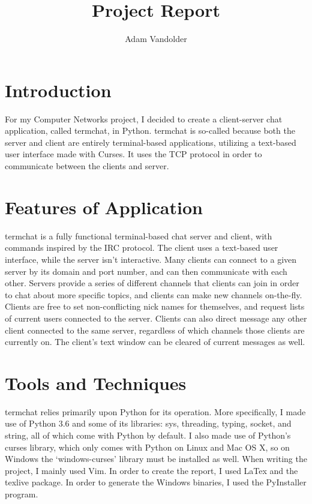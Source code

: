 \documentclass{article}
\title{Project Report}
\author{Adam Vandolder}
\date{}
\begin{document}
    \maketitle
    \tableofcontents
    \newpage
    \linespread{1.6}
    \selectfont

    \section{Introduction}
    For my Computer Networks project, I decided to create a client-server chat
    application, called termchat, in Python. termchat is so-called because both
    the server and client are entirely terminal-based applications, utilizing a
    text-based user interface made with Curses. It uses the TCP protocol in
    order to communicate between the clients and server.

    \section{Features of Application}
    termchat is a fully functional terminal-based chat server and client, with
    commands inspired by the IRC protocol. The client uses a text-based user
    interface, while the server isn't interactive. Many clients can connect to a
    given server by its domain and port number, and can then communicate with
    each other. Servers provide a series of different channels that clients can
    join in order to chat about more specific topics, and clients can make new
    channels on-the-fly. Clients are free to set non-conflicting nick names for
    themselves, and request lists of current users connected to the server.
    Clients can also direct message any other client connected to the same
    server, regardless of which channels those clients are currently on. The
    client's text window can be cleared of current messages as well.
    
    \section{Tools and Techniques}
    termchat relies primarily upon Python for its operation.
    More specifically, I made use of Python 3.6 and some of its libraries: sys,
    threading, typing, socket, and string, all of which come with Python by
    default. I also made use of Python's curses library, which only comes with
    Python on Linux and Mac OS X, so on Windows the `windows-curses' library
    must be installed as well. When writing the project, I mainly used Vim. In
    order to create the report, I used LaTex and the texlive package. In order
    to generate the Windows binaries, I used the PyInstaller program.
\end{document}
